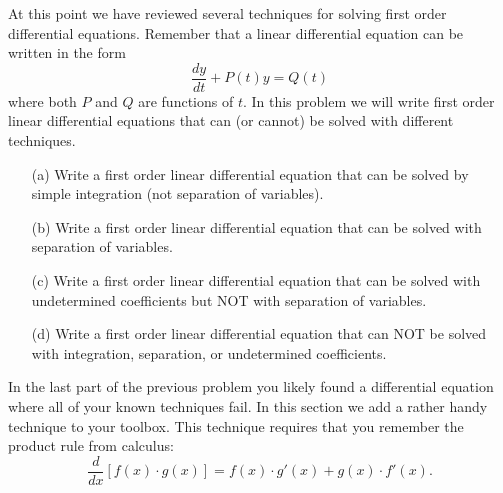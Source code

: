 \begin{problem}
    At this point we have reviewed several techniques for solving first order differential
    equations.  Remember that a linear differential equation can be written in the form
    \[ \frac{dy}{dt} + P(t) y = Q(t) \]
    where both $P$ and $Q$ are functions of $t$. In this problem we will write first order
    linear differential equations that can (or cannot) be solved with different
    techniques.
    \begin{enumerate}
        \item[(a)] Write a first order linear differential equation that can be solved
            by simple integration (not separation of variables).  
        \item[(b)] Write a first order linear differential equation that can be solved
            with separation of variables.
        \item[(c)] Write a first order linear differential equation that can be solved
            with undetermined coefficients but NOT with separation of variables.
        \item[(d)] Write a first order linear differential equation that can NOT be
            solved with integration, separation, or undetermined coefficients.
    \end{enumerate}
\end{problem}

In the last part of the previous problem you likely found a differential equation where
all of your known techniques fail.  In this section we add a rather handy technique to
your toolbox.  This technique requires that you remember the product rule from calculus:
\[ \frac{d}{dx}\left[ f(x) \cdot g(x) \right] = f(x) \cdot g'(x) + g(x) \cdot f'(x). \]

